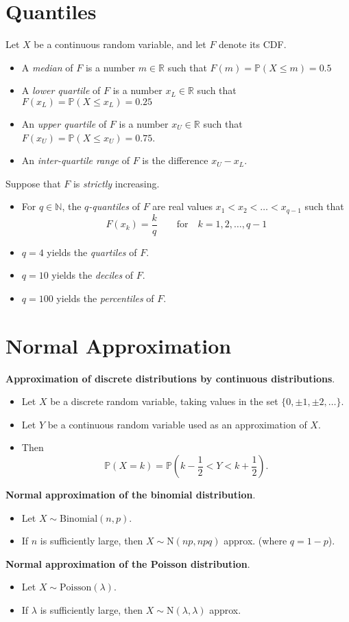 \documentclass[lecture]{csm}
\newcommand{\prob}{\mathbb{P}}
\newcommand{\N}{\mathbb{N}}
\newcommand{\R}{\mathbb{R}}
\def\it{\item}
\def\bit{\begin{itemize}}
\def\eit{\end{itemize}}
\begin{document}
\section{Quantiles}
Let $X$ be a continuous random variable, and let $F$ denote its CDF.
\bit
\it A \emph{median} of $F$ is a number $m\in\R$ such that $F(m)=\prob(X\leq m)=0.5$%
\it
A \emph{lower quartile} of $F$ is a number $x_L\in\R$ such that $F(x_L) = \prob(X\leq x_L) = 0.25$
\it
An \emph{upper quartile} of $F$ is a number $x_U\in\R$ such that $F(x_U) = \prob(X\leq x_U) = 0.75$.
\it 
An  \emph{inter-quartile range} of $F$ is the difference $x_U-x_L$.
\eit

\vspace*{1ex}
Suppose that $F$ is \emph{strictly} increasing.
\bit
\it For $q\in\N$, the \emph{$q$-quantiles} of $F$ are real values $x_1 < x_2 < \ldots < x_{q-1}$ such that 
\[
F(x_k) = \frac{k}{q} \qquad\text{for}\quad k=1,2,\ldots,q-1
\]
\it $q=4$ yields the \emph{quartiles} of $F$.
\it $q=10$ yields the \emph{deciles} of $F$.
\it $q=100$ yields the \emph{percentiles} of $F$.
\eit


\newpage
\section{Normal Approximation}

\textbf{Approximation of discrete distributions by continuous distributions}.
\bit
\it Let $X$ be a discrete random variable, taking values in the set $\{0,\pm 1,\pm 2,\ldots\}$.
\it Let $Y$ be a continuous random variable used as an approximation of $X$.
\it Then
\[
\prob(X=k) = \prob\left(k - \frac{1}{2} < Y < k + \frac{1}{2}\right).
\] 
\eit

\vspace*{1ex}
\textbf{Normal approximation of the binomial distribution}.
\bit
\it Let $X\sim\text{Binomial}(n,p)$.
\it If $n$ is sufficiently large, then $X\sim\text{N}(np,npq)$ approx. (where $q=1-p$).
\eit

\vspace*{1ex}
\textbf{Normal approximation of the Poisson distribution}.
\bit
\it Let $X\sim\text{Poisson}(\lambda)$.
\it If $\lambda$ is sufficiently large, then $X\sim\text{N}(\lambda,\lambda)$ approx.
\eit

\end{document}
